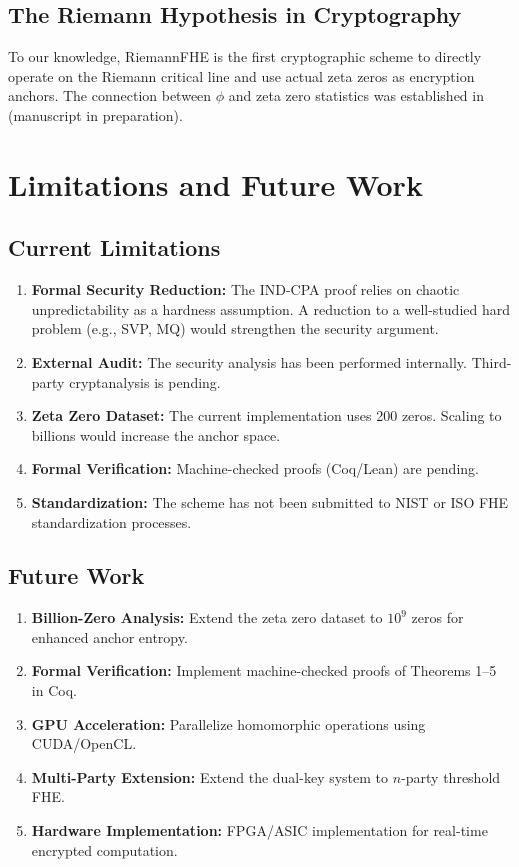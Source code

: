 \documentclass[11pt,a4paper]{article}
\theoremstyle{remark}
\begin{document}
\subsection{The Riemann Hypothesis in Cryptography}

To our knowledge, RiemannFHE is the first cryptographic scheme to directly operate on the Riemann critical line and use actual zeta zeros as encryption anchors. The connection between $\phi$ and zeta zero statistics was established in \cite{fernandez2026zeta} (manuscript in preparation).

\section{Limitations and Future Work}

\subsection{Current Limitations}

\begin{enumerate}[label=(\arabic*)]
    \item \textbf{Formal Security Reduction:} The IND-CPA proof relies on chaotic unpredictability as a hardness assumption. A reduction to a well-studied hard problem (e.g., SVP, MQ) would strengthen the security argument.
    \item \textbf{External Audit:} The security analysis has been performed internally. Third-party cryptanalysis is pending.
    \item \textbf{Zeta Zero Dataset:} The current implementation uses 200 zeros. Scaling to billions would increase the anchor space.
    \item \textbf{Formal Verification:} Machine-checked proofs (Coq/Lean) are pending.
    \item \textbf{Standardization:} The scheme has not been submitted to NIST or ISO FHE standardization processes.
\end{enumerate}

\subsection{Future Work}

\begin{enumerate}[label=(\arabic*)]
    \item \textbf{Billion-Zero Analysis:} Extend the zeta zero dataset to $10^9$ zeros for enhanced anchor entropy.
    \item \textbf{Formal Verification:} Implement machine-checked proofs of Theorems 1–5 in Coq.
    \item \textbf{GPU Acceleration:} Parallelize homomorphic operations using CUDA/OpenCL.
    \item \textbf{Multi-Party Extension:} Extend the dual-key system to $n$-party threshold FHE.
    \item \textbf{Hardware Implementation:} FPGA/ASIC implementation for real-time encrypted computation.
\end{enumerate}
\end{document}
